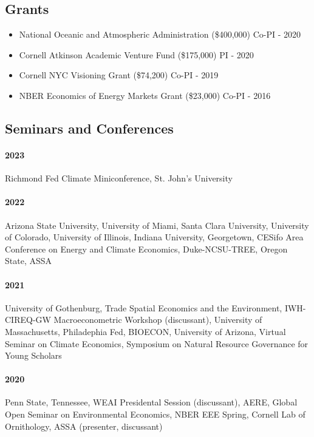 \documentclass[11pt]{res} %
\begin{document}
\begin{resume}
\subsection{Grants}
\begin{itemize}  \itemsep -1pt
	\item[] National Oceanic and Atmospheric Administration (\$400,000) \hfill Co-PI - 2020
	\item[] Cornell Atkinson Academic Venture Fund (\$175,000) \hfill PI - 2020
	\item[] Cornell NYC Visioning Grant (\$74,200) \hfill Co-PI - 2019
	\item[] NBER Economics of Energy Markets Grant (\$23,000) \hfill Co-PI - 2016
\end{itemize}

\vspace{-.2in}

\subsection{Seminars and Conferences}\vspace{-.1in}
\paragraph{2023} Richmond Fed Climate Miniconference, St. John's University 
\paragraph{2022} Arizona State University, University of Miami, Santa Clara University, University of Colorado, University of Illinois, Indiana University, Georgetown, CESifo Area Conference on Energy and Climate Economics, Duke-NCSU-TREE, Oregon State, ASSA \vspace{-.2in}
\paragraph{2021} University of Gothenburg, Trade Spatial Economics and the Environment, IWH-CIREQ-GW Macroeconometric Workshop (discussant), University of Massachusetts, Philadephia Fed, BIOECON, University of Arizona, Virtual Seminar on Climate Economics, Symposium on Natural Resource Governance for Young Scholars \vspace{-.2in}
\paragraph{2020} Penn State, Tennessee, WEAI Presidental Session (discussant), AERE, Global Open Seminar on Environmental Economics, NBER EEE Spring, Cornell Lab of Ornithology, ASSA (presenter, discussant) \vspace{-.2in}

\end{resume}
\end{document}
